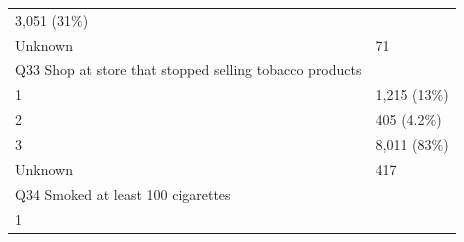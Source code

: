 \documentclass[]{article}
\begin{document}
\begin{longtable}[]{@{}ll@{}}
\begin{minipage}[t]{0.23\columnwidth}
3,051 (31\%)\strut
\end{minipage}\tabularnewline
\begin{minipage}[t]{0.71\columnwidth}\raggedright
Unknown\strut
\end{minipage} & \begin{minipage}[t]{0.23\columnwidth}\raggedright
71\strut
\end{minipage}\tabularnewline
\begin{minipage}[t]{0.71\columnwidth}\raggedright
Q33 Shop at store that stopped selling tobacco products\strut
\end{minipage} & \begin{minipage}[t]{0.23\columnwidth}\raggedright
\strut
\end{minipage}\tabularnewline
\begin{minipage}[t]{0.71\columnwidth}\raggedright
1\strut
\end{minipage} & \begin{minipage}[t]{0.23\columnwidth}\raggedright
1,215 (13\%)\strut
\end{minipage}\tabularnewline
\begin{minipage}[t]{0.71\columnwidth}\raggedright
2\strut
\end{minipage} & \begin{minipage}[t]{0.23\columnwidth}\raggedright
405 (4.2\%)\strut
\end{minipage}\tabularnewline
\begin{minipage}[t]{0.71\columnwidth}\raggedright
3\strut
\end{minipage} & \begin{minipage}[t]{0.23\columnwidth}\raggedright
8,011 (83\%)\strut
\end{minipage}\tabularnewline
\begin{minipage}[t]{0.71\columnwidth}\raggedright
Unknown\strut
\end{minipage} & \begin{minipage}[t]{0.23\columnwidth}\raggedright
417\strut
\end{minipage}\tabularnewline
\begin{minipage}[t]{0.71\columnwidth}\raggedright
Q34 Smoked at least 100 cigarettes\strut
\end{minipage} & \begin{minipage}[t]{0.23\columnwidth}\raggedright
\strut
\end{minipage}\tabularnewline
\begin{minipage}[t]{0.71\columnwidth}\raggedright
1\strut
\end{minipage} & \begin{minipage}[t]{0.23\columnwidth}\raggedright

\end{minipage}
\end{longtable}
\end{document}
